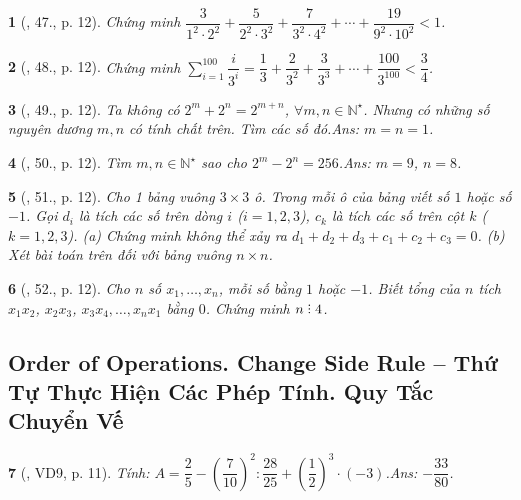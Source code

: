 \documentclass{article}
\newtheorem{baitoan}{}
\DeclareRobustCommand{\divby}{%
	\mathrel{\vbox{\baselineskip.65ex\lineskiplimit0pt\hbox{.}\hbox{.}\hbox{.}}}%
}
\begin{document}
\begin{baitoan}[\cite{Binh_Toan_7_tap_1}, 47., p. 12]
	Chứng minh $\dfrac{3}{1^2\cdot 2^2} + \dfrac{5}{2^2\cdot 3^2} + \dfrac{7}{3^2\cdot 4^2} + \cdots + \dfrac{19}{9^2\cdot 10^2} < 1$.
\end{baitoan}

\begin{baitoan}[\cite{Binh_Toan_7_tap_1}, 48., p. 12]
	Chứng minh $\sum_{i=1}^{100} \dfrac{i}{3^i} = \dfrac{1}{3} + \dfrac{2}{3^2} + \dfrac{3}{3^3} + \cdots + \dfrac{100}{3^{100}} < \dfrac{3}{4}$.
\end{baitoan}

\begin{baitoan}[\cite{Binh_Toan_7_tap_1}, 49., p. 12]
	Ta không có $2^m + 2^n = 2^{m+n}$, $\forall m,n\in\mathbb{N}^\star$. Nhưng có những số nguyên dương $m,n$ có tính chất trên. Tìm các số đó.\hfill{\sf Ans: $m = n = 1$.}
\end{baitoan}

\begin{baitoan}[\cite{Binh_Toan_7_tap_1}, 50., p. 12]
	Tìm $m,n\in\mathbb{N}^\star$ sao cho $2^m - 2^n = 256$.\hfill{\sf Ans: $m = 9$, $n = 8$.}
\end{baitoan}

\begin{baitoan}[\cite{Binh_Toan_7_tap_1}, 51., p. 12]
	Cho 1 bảng vuông $3\times 3$ ô. Trong mỗi ô của bảng viết số $1$ hoặc số $-1$. Gọi $d_i$ là tích các số trên dòng $i$ ($i = 1,2,3$), $c_k$ là tích các số trên cột $k$ ($k = 1,2,3$). (a) Chứng minh không thể xảy ra $d_1 + d_2 + d_3 + c_1 + c_2 + c_3 = 0$. (b) Xét bài toán trên đối với bảng vuông $n\times n$.	
\end{baitoan}

\begin{baitoan}[\cite{Binh_Toan_7_tap_1}, 52., p. 12]
	Cho $n$ số $x_1,\ldots,x_n$, mỗi số bằng $1$ hoặc $-1$. Biết tổng của $n$ tích $x_1x_2$, $x_2x_3$, $x_3x_4,\ldots,x_nx_1$ bằng $0$. Chứng minh $n\divby4$.
\end{baitoan}


\subsection{Order of Operations. Change Side Rule -- Thứ Tự Thực Hiện Các Phép Tính. Quy Tắc Chuyển Vế}

\begin{baitoan}[\cite{Tuyen_Toan_7}, VD9, p. 11]
	Tính: $A = \dfrac{2}{5} - \left(\dfrac{7}{10}\right)^2:\dfrac{28}{25} + \left(\dfrac{1}{2}\right)^3\cdot(-3)$.\hfill{\sf Ans: $-\dfrac{33}{80}$.}
\end{baitoan}
\end{document}
